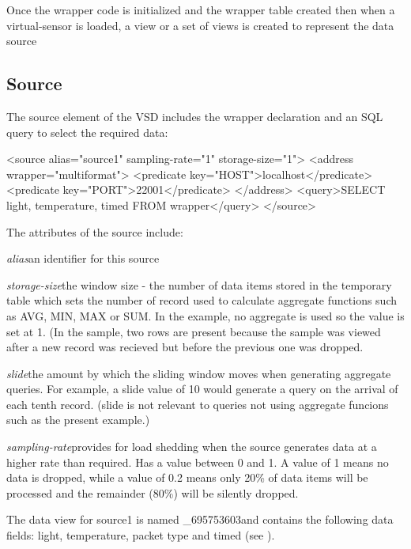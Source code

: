 Once the wrapper code is initialized and the wrapper table created
then when a virtual-sensor is loaded,  a view or a set of views is
created to represent the data source

\subsection{Source}

The source element of the VSD includes the wrapper declaration and an
SQL query to select the required data:

\begin{xmlcode} 	
<source alias="source1" sampling-rate="1" storage-size="1">
		<address wrapper="multiformat">
			<predicate key="HOST">localhost</predicate>
			<predicate key="PORT">22001</predicate>
		</address>
		<query>SELECT light, temperature, timed FROM wrapper</query>
	</source>
\end{xmlcode}

The attributes of the source include:

\textit{alias}\hspace{15pt}an identifier for this source

\textit{storage-size}\hspace{15pt}the window size - the number of data
items stored in the temporary table which sets the number of record
used to calculate aggregate functions such as AVG, MIN, MAX or SUM.  In
the example, no aggregate is used so the value is set at 1.  (In the
sample, two rows are present because the sample was viewed after a new
record was recieved but before the previous one was dropped.

\textit{slide}\hspace{15pt}the amount by which the sliding window
moves when generating aggregate queries.  For example, a slide value of
10 would generate a query on the arrival of each tenth record.  (slide
is not relevant to queries not using aggregate funcions such as the
present example.)

\textit{sampling-rate}\hspace{15pt}provides for load shedding when the
source generates data at a higher rate than required.  Has a value
between 0 and 1.  A value of 1 means no data is dropped, while a value
of 0.2 means only 20\% of data items will be processed and the
remainder (80\%) will be silently dropped.

The data view for source1 is named \_695753603and contains the
following data fields: light, temperature, packet type and timed (see
).

